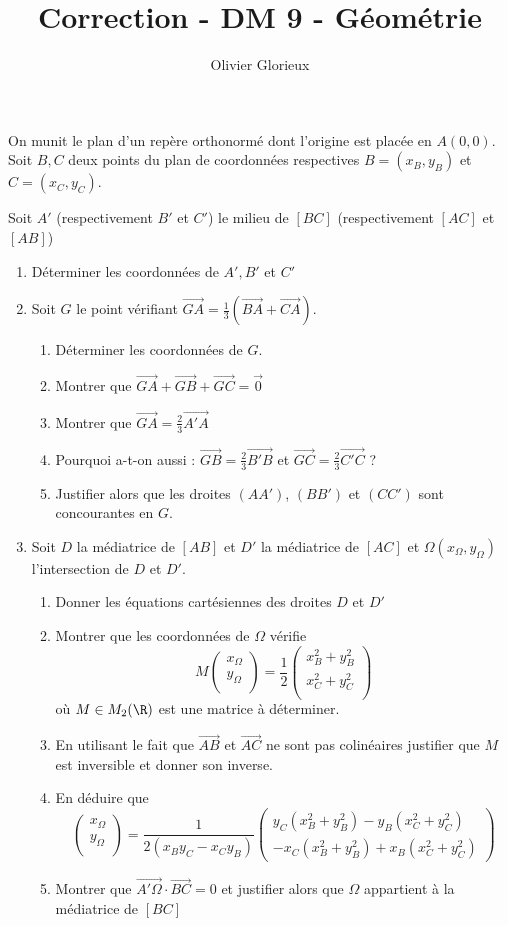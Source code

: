 \documentclass[a4paper, 11pt,reqno]{article}
\author{Olivier Glorieux}
\newcommand\vv[1]{\overrightarrow{#1}}
\begin{document}
\title{Correction - DM 9 - Géométrie 
}
\begin{exercice}%
On munit le plan d’un repère orthonormé dont l’origine est placée en $A(0, 0).$
Soit $B, C$ deux points du plan de coordonnées respectives 
$B=(x_B,y_B)$ et $C=(x_C,y_C)$.

Soit $A'$ (respectivement $B'$ et $C'$) le milieu de $[BC]$ (respectivement $[AC]$ et $[AB]$)
\begin{enumerate}
\item Déterminer  les coordonnées de $A', B' $ et $C'$
\item Soit $G$ le point vérifiant $\vv{GA} = \frac{1}{3} (\vv{BA} +\vv{CA})$. 
\begin{enumerate}
\item Déterminer les coordonnées de $G$. 
\item Montrer que $\vv{GA}+\vv{GB}+\vv{GC}=\vv{0}$
\item Montrer que $\vv{GA} =\frac{2}{3}\vv{A'A}$
\item Pourquoi a-t-on aussi :  $\vv{GB} =\frac{2}{3}\vv{B'B}$ et  $\vv{GC} =\frac{2}{3}\vv{C'C}$ ?
\item Justifier alors que les droites $(AA')$, $(BB')$ et $(CC')$ sont concourantes en $G$. 
\end{enumerate}
\item Soit $D$ la médiatrice de $[AB]$ et $D'$ la médiatrice de $[AC]$ et $\Omega(x_\Omega,y_\Omega)$ l'intersection de $D$ et $D'$. 
\begin{enumerate}
\item Donner les équations cartésiennes des droites $D$ et $D'$ 
\item Montrer que les coordonnées de $\Omega$ vérifie 
$$M \begin{pmatrix}
x_\Omega\\
y_\Omega\\
\end{pmatrix}= \frac{1}{2}\begin{pmatrix}
x_B^2+y_B^2\\
x_C^2+y_C^2\\
\end{pmatrix}$$
où $M\in M_2(\R)$ est une matrice à déterminer.
\item En utilisant le fait que $\vv{AB}$ et $\vv{AC}$ ne sont pas colinéaires justifier que $M$ est inversible et donner son inverse. 
\item En déduire que 
$$ \begin{pmatrix}
x_\Omega\\
y_\Omega\\
\end{pmatrix} = \frac{1}{2\left(x_B y_C-x_C y_B\right)}\left(\begin{array}{c}
y_C\left(x_B^2+y_B^2\right)-y_B\left(x_C^2+y_C^2\right) \\
-x_C\left(x_B^2+y_B^2\right)+x_B\left(x_C^2+y_C^2\right)
\end{array}\right)$$
\item Montrer que $\vv{A' \Omega}\cdot \vv{BC}=0$ et justifier alors que 
$\Omega $ appartient à la médiatrice de $[BC]$
\end{enumerate}


\end{enumerate}
\end{exercice}
\end{document}

